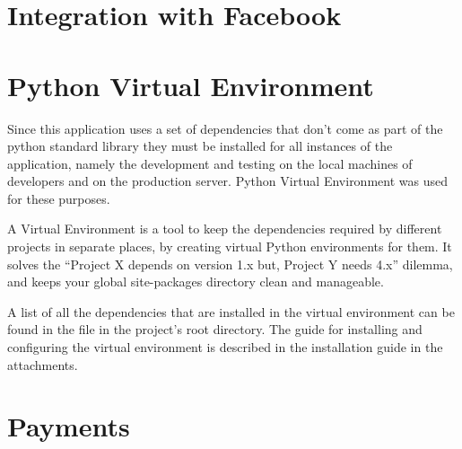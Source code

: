 \section{Integration with Facebook}
%
%
%


\section{Python Virtual Environment}
Since this application uses a set of dependencies that don’t come as part of the python standard library they must be
installed for all instances of the application, namely the development and testing on the local machines of developers
and on the production server. Python Virtual Environment was used for these purposes.

A Virtual Environment is a tool to keep the dependencies required by different projects in separate places, by
creating virtual Python environments for them. It solves the “Project X depends on version 1.x but, Project Y
needs 4.x” dilemma, and keeps your global site-packages directory clean and manageable.\cite{pythonvenv}

A list of all the dependencies that are installed in the virtual environment can be found in the 
file in the project's root directory. The guide for installing and configuring the virtual environment is described in
the installation guide in the attachments.

\section{Payments}

